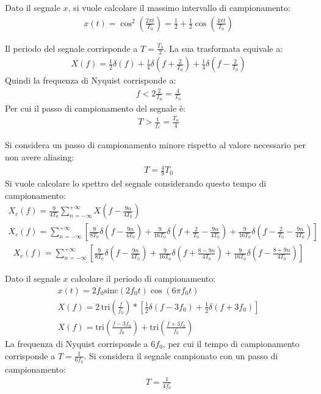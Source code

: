 \documentclass{article}
\newcommand{\sinc}{\mbox{sinc}}
\begin{document}
Dato il segnale $x$, si vuole calcolare il massimo intervallo di campionamento:
\begin{gather*}
    x(t)=\cos^2\left(\displaystyle\frac{2\pi t}{T_0}\right)=\frac{1}{2}+\frac{1}{2}\cos\left(\frac{4\pi t}{T_0}\right)
\end{gather*}

Il periodo del segnale corrisponde a $T=\displaystyle\frac{T_0}{2}$. La sua trasformata equivale a:
\begin{gather*}
    X(f)=\displaystyle\frac{1}{2}\delta(f)+\frac{1}{4}\delta\left(f+\frac{2}{T_0}\right)+\frac{1}{4}\delta\left(f-\frac{2}{T_0}\right)
\end{gather*}
Quindi la frequenza di Nyquist corrisponde a:
\begin{gather*}
    f<2\frac{2}{T_0}=\frac{4}{T_0}
\end{gather*}
Per cui il passo di campionamento del segnale è:
\begin{gather}
    T>\displaystyle\frac{1}{f_c}=\frac{T_0}{4}
\end{gather}

Si considera un passo di campionamento minore rispetto al valore necessario per non avere aliasing: 
\begin{gather*}
    T=\frac{4}{9}T_0
\end{gather*}
Si vuole calcolare lo spettro del segnale considerando questo tempo di campionamento:
\begin{gather*}
    X_c(f)=\displaystyle\frac{9}{4T_0}\sum_{n=-\infty}^{+\infty}X\left(f-\frac{9n}{4T_0}\right)\\
    X_c(f)=\sum_{n=-\infty}^{+\infty}\left[\frac{9}{8T_0}\delta\left(f-\frac{9n}{4T_0}\right)+\frac{9}{16T_0}\delta\left(f+\frac{2}{T_0}-\frac{9n}{4T_0}\right)+\frac{9}{16T_0}\delta\left(f-\frac{2}{T_0}-\frac{9n}{4T_0}\right)\right]
\end{gather*}
\begin{gather}
    X_c(f)=\displaystyle\sum_{n=-\infty}^{+\infty}\left[\frac{9}{8T_0}\delta\left(f-\frac{9n}{4T_0}\right)+\frac{9}{16T_0}\delta\left(f+\frac{8-9n}{4T_0}\right)+\frac{9}{16T_0}\delta\left(f-\frac{8+9n}{4T_0}\right)\right]
\end{gather}

Dato il segnale $x$ calcolare il periodo di campionamento:
\begin{gather*}
    x(t)=2f_0\sinc(2f_0t)\cos(6\pi f_0t)\\
    X(f)=\displaystyle2\,\mbox{tri}\left(\frac{f}{f_0}\right)*\left[\frac{1}{2}\delta\left(f-3f_0\right)+\frac{1}{2}\delta(f+3f_0)\right]\\
    X(f)=\displaystyle\mbox{tri}\left(\frac{f-3f_0}{f_0}\right)+\mbox{tri}\left(\frac{f+3f_0}{f_0}\right)
\end{gather*}
La frequenza di Nyquist corrisponde a $6f_0$, per cui il tempo di campionamento corrisponde a $T=\displaystyle\frac{1}{6f_0}$. Si considera il segnale campionato con un 
passo di campionamento:
\begin{gather*}
    T=\displaystyle\frac{1}{4f_0}
\end{gather*}
\end{document}
